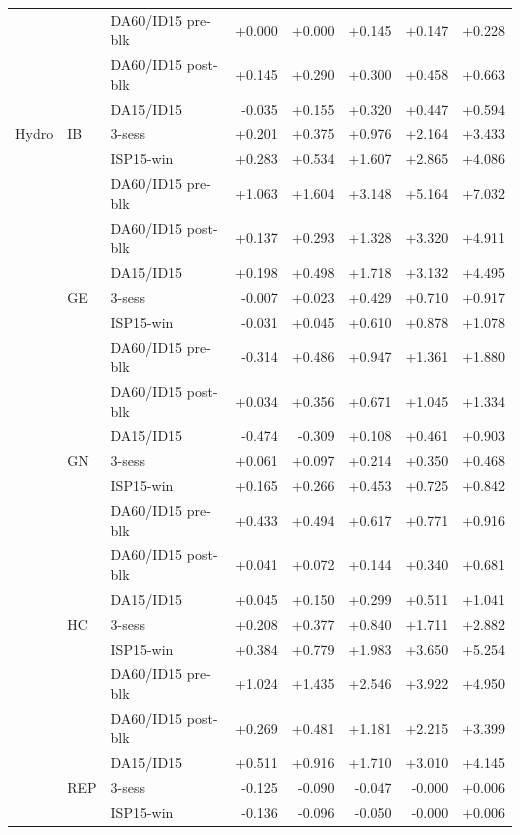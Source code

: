 \begin{tabular}{l l l r r r r r}
 &  & DA60/ID15 pre-blk & +0.000 & +0.000 & +0.145 & +0.147 & +0.228 \\
 &  & DA60/ID15 post-blk & +0.145 & +0.290 & +0.300 & +0.458 & +0.663 \\
 &  & DA15/ID15 & -0.035 & +0.155 & +0.320 & +0.447 & +0.594 \\
\addlinespace
Hydro & IB & 3-sess & +0.201 & +0.375 & +0.976 & +2.164 & +3.433 \\
 &  & ISP15-win & +0.283 & +0.534 & +1.607 & +2.865 & +4.086 \\
 &  & DA60/ID15 pre-blk & +1.063 & +1.604 & +3.148 & +5.164 & +7.032 \\
 &  & DA60/ID15 post-blk & +0.137 & +0.293 & +1.328 & +3.320 & +4.911 \\
 &  & DA15/ID15 & +0.198 & +0.498 & +1.718 & +3.132 & +4.495 \\
 & GE & 3-sess & -0.007 & +0.023 & +0.429 & +0.710 & +0.917 \\
 &  & ISP15-win & -0.031 & +0.045 & +0.610 & +0.878 & +1.078 \\
 &  & DA60/ID15 pre-blk & -0.314 & +0.486 & +0.947 & +1.361 & +1.880 \\
 &  & DA60/ID15 post-blk & +0.034 & +0.356 & +0.671 & +1.045 & +1.334 \\
 &  & DA15/ID15 & -0.474 & -0.309 & +0.108 & +0.461 & +0.903 \\
 & GN & 3-sess & +0.061 & +0.097 & +0.214 & +0.350 & +0.468 \\
 &  & ISP15-win & +0.165 & +0.266 & +0.453 & +0.725 & +0.842 \\
 &  & DA60/ID15 pre-blk & +0.433 & +0.494 & +0.617 & +0.771 & +0.916 \\
 &  & DA60/ID15 post-blk & +0.041 & +0.072 & +0.144 & +0.340 & +0.681 \\
 &  & DA15/ID15 & +0.045 & +0.150 & +0.299 & +0.511 & +1.041 \\
 & HC & 3-sess & +0.208 & +0.377 & +0.840 & +1.711 & +2.882 \\
 &  & ISP15-win & +0.384 & +0.779 & +1.983 & +3.650 & +5.254 \\
 &  & DA60/ID15 pre-blk & +1.024 & +1.435 & +2.546 & +3.922 & +4.950 \\
 &  & DA60/ID15 post-blk & +0.269 & +0.481 & +1.181 & +2.215 & +3.399 \\
 &  & DA15/ID15 & +0.511 & +0.916 & +1.710 & +3.010 & +4.145 \\
 & REP & 3-sess & -0.125 & -0.090 & -0.047 & -0.000 & +0.006 \\
 &  & ISP15-win & -0.136 & -0.096 & -0.050 & -0.000 & +0.006 \\

\end{tabular}
